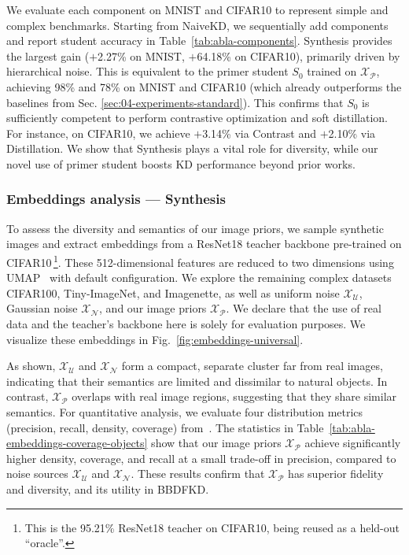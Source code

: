 \begin{foldable}
  We evaluate each component on MNIST and CIFAR10 to represent simple and complex benchmarks.
  Starting from NaiveKD, we sequentially add components and report student accuracy in Table~\ref{tab:abla-components}.
  Synthesis provides the largest gain ($+$2.27\% on MNIST, $+$64.18\% on CIFAR10), primarily driven by hierarchical noise.
  This is equivalent to the primer student $S_0$ trained on $\mathcal{X}_\mathcal{P}$, achieving 98\% and 78\% on MNIST and CIFAR10 (which already outperforms the baselines from Sec. \ref{sec:04-experiments-standard}).
  This confirms that $S_0$ is sufficiently competent to perform contrastive optimization and soft distillation.
  For instance, on CIFAR10, we achieve $+$3.14\% via Contrast and $+$2.10\% via Distillation.
  We show that Synthesis plays a vital role for diversity, while our novel use of primer student boosts KD performance beyond prior works.
\end{foldable}

\subsubsection{Embeddings analysis --- Synthesis} \label{sec:04-experiments-ablation-embeddings-generation}
\begin{foldable}
  To assess the diversity and semantics of our image priors, we sample synthetic images and extract embeddings from a ResNet18 teacher backbone pre-trained on CIFAR10\,\footnote{This is the 95.21\% ResNet18 teacher on CIFAR10, being reused as a held-out ``oracle''.}.
  These 512-dimensional features are reduced to two dimensions using UMAP~\cite{mcinnes2018umap} with default configuration.
  We explore the remaining complex datasets CIFAR100, Tiny-ImageNet, and Imagenette, as well as uniform noise $\mathcal{X}_\mathcal{U}$, Gaussian noise $\mathcal{X}_\mathcal{N}$, and our image priors $\mathcal{X}_\mathcal{P}$.
  We declare that the use of real data and the teacher's backbone here is solely for evaluation purposes.
  We visualize these embeddings in Fig.~\ref{fig:embeddings-universal}.
\end{foldable}

\begin{foldable}
  As shown, $\mathcal{X}_\mathcal{U}$ and $\mathcal{X}_\mathcal{N}$ form a compact, separate cluster far from real images, indicating that their semantics are limited and dissimilar to natural objects.
  In contrast, $\mathcal{X}_\mathcal{P}$ overlaps with real image regions, suggesting that they share similar semantics.
  For quantitative analysis, we evaluate four distribution metrics (precision, recall, density, coverage) from~\cite{naeem2020reliable}.
  The statistics in Table~\ref{tab:abla-embeddings-coverage-objects} show that our image priors $\mathcal{X}_\mathcal{P}$ achieve significantly higher density, coverage, and recall at a small trade-off in precision, compared to noise sources $\mathcal{X}_\mathcal{U}$ and $\mathcal{X}_\mathcal{N}$.
  These results confirm that $\mathcal{X}_\mathcal{P}$ has superior fidelity and diversity, and its utility in BBDFKD.
\end{foldable}

